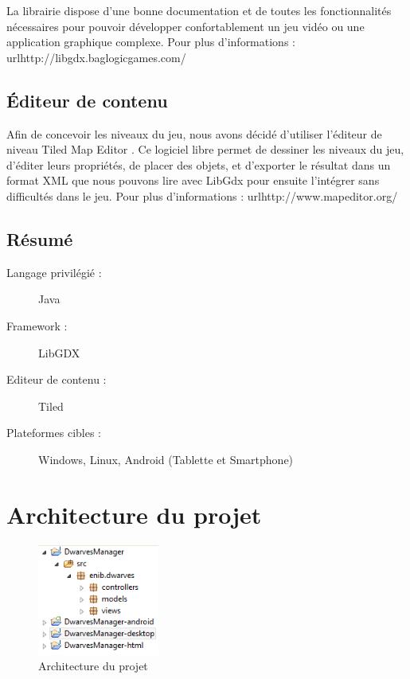 \documentclass[a4paper]{report}
\begin{document}
La librairie dispose d'une bonne documentation et de toutes les fonctionnalités nécessaires pour pouvoir développer confortablement un jeu vidéo ou une application graphique complexe.
Pour plus d'informations : url{http://libgdx.baglogicgames.com/}


\section*{Éditeur de contenu}

Afin de concevoir les niveaux du jeu, nous avons décidé d'utiliser l'éditeur de niveau \og Tiled Map Editor \fg. Ce logiciel libre permet de dessiner les niveaux du jeu, d'éditer leurs propriétés, de placer des objets, et d'exporter le résultat dans un format XML que nous pouvons lire avec LibGdx pour ensuite l'intégrer sans difficultés dans le jeu.
Pour plus d'informations : url{http://www.mapeditor.org/}

\section*{Résumé}


\begin{description}
\item[Langage privilégié :]Java
\item[Framework :]LibGDX
\item[Editeur de contenu :]Tiled
\item[Plateformes cibles :]Windows, Linux, Android (Tablette et Smartphone)
\end{description}

\newpage

\chapter*{Architecture du projet}

\begin{figure}
    \center
    \includegraphics[width=4cm]{img/divers/architecture}
    \caption{Architecture du projet}
		\label{Architecture}
\end{figure}
\end{document}
